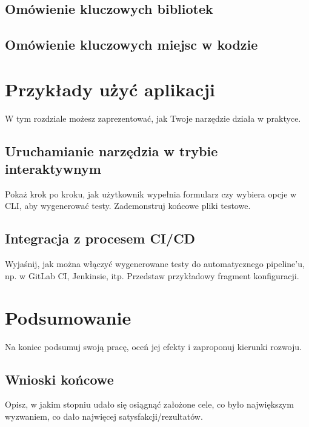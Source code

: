 \documentclass[12pt]{report}
\begin{document}
\section{Omówienie kluczowych bibliotek}

\section{Omówienie kluczowych miejsc w kodzie}

\chapter{Przykłady użyć aplikacji}
{W tym rozdziale możesz zaprezentować, jak Twoje narzędzie działa w praktyce.}

\section{Uruchamianie narzędzia w trybie interaktywnym}
{Pokaż krok po kroku, jak użytkownik wypełnia formularz czy wybiera opcje w CLI, aby wygenerować testy. Zademonstruj końcowe pliki testowe.}

\section{Integracja z procesem CI/CD}
{Wyjaśnij, jak można włączyć wygenerowane testy do automatycznego pipeline’u, np. w GitLab CI, Jenkinsie, itp. Przedstaw przykładowy fragment konfiguracji.}

\chapter{Podsumowanie}
{Na koniec podsumuj swoją pracę, oceń jej efekty i zaproponuj kierunki rozwoju.}

\section{Wnioski końcowe}
{Opisz, w jakim stopniu udało się osiągnąć założone cele, co było największym wyzwaniem, co dało najwięcej satysfakcji/rezultatów.}
\end{document}
